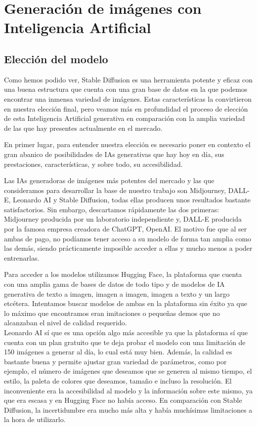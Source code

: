 \chapter{Generación de imágenes con Inteligencia Artificial}
\label{cap:genimgsia}

\section{Elección del modelo}

Como hemos podido ver, Stable Diffusion es una herramienta potente y eficaz con una buena estructura que cuenta con una gran base de datos en la que podemos encontrar una inmensa variedad de imágenes. Estas características la convirtieron en nuestra elección final, pero veamos más en profundidad el proceso de elección de esta Inteligencia Artificial generativa en comparación con la amplia variedad de las que hay presentes actualmente en el mercado. 

En primer lugar, para entender nuestra elección es necesario poner en contexto el gran abanico de posibilidades de IAs generativas que hay hoy en día, sus prestaciones, características, y sobre todo, su accesibilidad. 

Las IAs generadoras de imágenes más potentes del mercado y las que consideramos para desarrollar la base de nuestro trabajo son Midjourney, DALL-E, Leonardo AI y Stable Diffusion, todas ellas producen unos resultados bastante satisfactorios. Sin embargo, descartamos rápidamente las dos primeras: Midjourney producida por un laboratorio independiente y,
DALL-E producida por la famosa empresa creadora de ChatGPT, OpenAI. El motivo fue que al ser ambas de pago, no podíamos tener acceso a su modelo de forma tan amplia como las demás, siendo prácticamente imposible acceder a ellas y mucho menos a poder entrenarlas. 

Para acceder a los modelos utilizamos Hugging Face, la plataforma  que cuenta con una amplia gama de bases de datos de todo tipo y de modelos de IA generativa de texto a imagen, imagen a imagen, imagen a texto y un largo etcétera. Intentamos buscar modelos de ambas en la plataforma sin éxito ya que lo máximo que encontramos eran imitaciones o pequeñas demos que no alcanzaban el nivel de calidad requerido. \\


Leonardo AI sí que es una opción algo más accesible ya que la plataforma sí que cuenta con un plan gratuito que te deja probar el modelo con una limitación de 150 imágenes a generar al día, lo cual está muy bien. Además, la calidad es bastante buena y permite ajustar gran variedad de parámetros, como por ejemplo, el número de imágenes que deseamos que se generen al mismo tiempo, el estilo, la paleta de colores que deseamos, tamaño e incluso la resolución. El inconveniente era la accesibilidad al modelo y la información sobre este mismo, ya que era escasa y en Hugging Face no había acceso. En comparación con Stable Diffusion, la incertidumbre era mucho más alta y había muchísimas limitaciones a la hora de utilizarlo. \\

